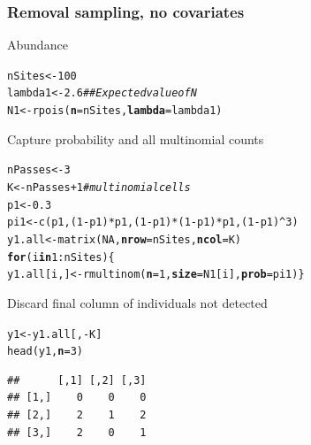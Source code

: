 \documentclass[color=usenames,dvipsnames]{beamer}\usepackage[]{graphicx}\usepackage[]{color}
\makeatletter
\newcommand{\hlnum}[1]{\textcolor[rgb]{0.69,0.494,0}{#1}}%
\newcommand{\hlcom}[1]{\textcolor[rgb]{0.514,0.506,0.514}{\textit{#1}}}%
\newcommand{\hlopt}[1]{\textcolor[rgb]{0,0,0}{#1}}%
\newcommand{\hlstd}[1]{\textcolor[rgb]{0,0,0}{#1}}%
\newcommand{\hlkwa}[1]{\textcolor[rgb]{0,0,0}{\textbf{#1}}}%
\newcommand{\hlkwb}[1]{\textcolor[rgb]{0,0.341,0.682}{#1}}%
\newcommand{\hlkwc}[1]{\textcolor[rgb]{0,0,0}{\textbf{#1}}}%
\newcommand{\hlkwd}[1]{\textcolor[rgb]{0.004,0.004,0.506}{#1}}%
\newenvironment{kframe}{%
 \def\at@end@of@kframe{}%
 \ifinner\ifhmode%
  \def\at@end@of@kframe{\end{minipage}}%
  \begin{minipage}{\columnwidth}%
 \fi\fi%
 \def\FrameCommand##1{\hskip\@totalleftmargin \hskip-\fboxsep
 \colorbox{shadecolor}{##1}\hskip-\fboxsep
     \hskip-\linewidth \hskip-\@totalleftmargin \hskip\columnwidth}%
 \MakeFramed {\advance\hsize-\width
   \@totalleftmargin\z@ \linewidth\hsize
   \@setminipage}}%
 {\par\unskip\endMakeFramed%
 \at@end@of@kframe}
\newenvironment{knitrout}{}{} %
\makeatother
\begin{document}
\begin{frame}[fragile]
  \frametitle{Removal sampling, no covariates}
  \small
  Abundance
\begin{knitrout}\scriptsize
{}\color{fgcolor}\begin{kframe}
\begin{alltt}
\hlstd{nSites} \hlkwb{<-} \hlnum{100}
\hlstd{lambda1} \hlkwb{<-} \hlnum{2.6}  \hlcom{## Expected value of N}
\hlstd{N1} \hlkwb{<-} \hlkwd{rpois}\hlstd{(}\hlkwc{n}\hlstd{=nSites,} \hlkwc{lambda}\hlstd{=lambda1)}
\end{alltt}
\end{kframe}
\end{knitrout}
  \pause
  \vfill
  Capture probability and \alert{all} multinomial counts
\begin{knitrout}\scriptsize
{}\color{fgcolor}\begin{kframe}
\begin{alltt}
\hlstd{nPasses} \hlkwb{<-} \hlnum{3}
\hlstd{K} \hlkwb{<-} \hlstd{nPasses}\hlopt{+}\hlnum{1}  \hlcom{# multinomial cells}
\hlstd{p1} \hlkwb{<-} \hlnum{0.3}
\hlstd{pi1} \hlkwb{<-} \hlkwd{c}\hlstd{(p1, (}\hlnum{1}\hlopt{-}\hlstd{p1)}\hlopt{*}\hlstd{p1, (}\hlnum{1}\hlopt{-}\hlstd{p1)}\hlopt{*}\hlstd{(}\hlnum{1}\hlopt{-}\hlstd{p1)}\hlopt{*}\hlstd{p1, (}\hlnum{1}\hlopt{-}\hlstd{p1)}\hlopt{^}\hlnum{3}\hlstd{)}
\hlstd{y1.all} \hlkwb{<-} \hlkwd{matrix}\hlstd{(}\hlnum{NA}\hlstd{,} \hlkwc{nrow}\hlstd{=nSites,} \hlkwc{ncol}\hlstd{=K)}
\hlkwa{for}\hlstd{(i} \hlkwa{in} \hlnum{1}\hlopt{:}\hlstd{nSites) \{}
    \hlstd{y1.all[i,]} \hlkwb{<-} \hlkwd{rmultinom}\hlstd{(}\hlkwc{n}\hlstd{=}\hlnum{1}\hlstd{,} \hlkwc{size}\hlstd{=N1[i],} \hlkwc{prob}\hlstd{=pi1)    \}}
\end{alltt}
\end{kframe}
\end{knitrout}
  \pause
  \vfill
  Discard final column of individuals not detected
\begin{knitrout}\scriptsize
{}\color{fgcolor}\begin{kframe}
\begin{alltt}
\hlstd{y1} \hlkwb{<-} \hlstd{y1.all[,}\hlopt{-}\hlstd{K]}
\hlkwd{head}\hlstd{(y1,} \hlkwc{n}\hlstd{=}\hlnum{3}\hlstd{)}
\end{alltt}
\begin{verbatim}
##      [,1] [,2] [,3]
## [1,]    0    0    0
## [2,]    2    1    2
## [3,]    2    0    1
\end{verbatim}
\end{kframe}
\end{knitrout}
\end{frame}
\end{document}
